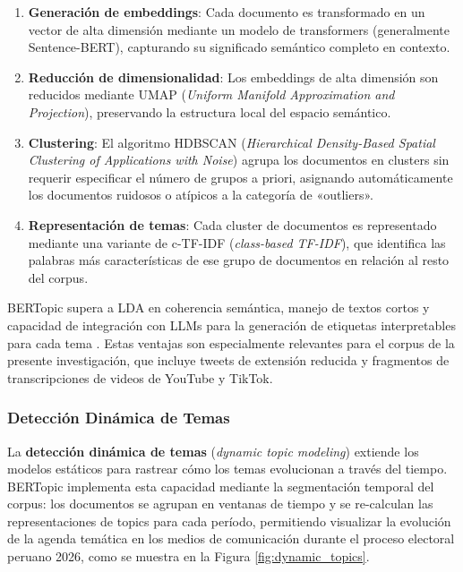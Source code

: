 \begin{enumerate}
    \item \textbf{Generación de embeddings}: Cada documento es transformado en un vector de alta dimensión mediante un modelo de transformers (generalmente Sentence-BERT), capturando su significado semántico completo en contexto.
    \item \textbf{Reducción de dimensionalidad}: Los embeddings de alta dimensión son reducidos mediante UMAP (\textit{Uniform Manifold Approximation and Projection}), preservando la estructura local del espacio semántico.
    \item \textbf{Clustering}: El algoritmo HDBSCAN (\textit{Hierarchical Density-Based Spatial Clustering of Applications with Noise}) agrupa los documentos en clusters sin requerir especificar el número de grupos a priori, asignando automáticamente los documentos ruidosos o atípicos a la categoría de «outliers».
    \item \textbf{Representación de temas}: Cada cluster de documentos es representado mediante una variante de c-TF-IDF (\textit{class-based TF-IDF}), que identifica las palabras más características de ese grupo de documentos en relación al resto del corpus.
\end{enumerate}

BERTopic supera a LDA en coherencia semántica, manejo de textos cortos y capacidad de integración con LLMs para la generación de etiquetas interpretables para cada tema \parencite{tec_grootendorst2022bertopic}. Estas ventajas son especialmente relevantes para el corpus de la presente investigación, que incluye tweets de extensión reducida y fragmentos de transcripciones de videos de YouTube y TikTok.

\subsubsection{Detección Dinámica de Temas}

La \textbf{detección dinámica de temas} (\textit{dynamic topic modeling}) extiende los modelos estáticos para rastrear cómo los temas evolucionan a través del tiempo. BERTopic implementa esta capacidad mediante la segmentación temporal del corpus: los documentos se agrupan en ventanas de tiempo y se re-calculan las representaciones de topics para cada período, permitiendo visualizar la evolución de la agenda temática en los medios de comunicación durante el proceso electoral peruano 2026, como se muestra en la Figura \ref{fig:dynamic_topics}.

